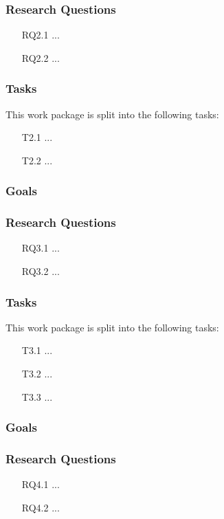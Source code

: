 \subsubsection{Research Questions}
\begin{itemize}
	\item[RQ2.1] ...
	\item[RQ2.2] ...
\end{itemize}

\subsubsection{Tasks}
This work package is split into the following tasks:
\begin{itemize}
	\item[T2.1] ...
	\item[T2.2] ...
\end{itemize}


\subsubsection{Goals}
\blindtext

\subsubsection{Research Questions}
\begin{itemize}
	\item[RQ3.1] ...
	\item[RQ3.2] ...
\end{itemize}

\subsubsection{Tasks}
This work package is split into the following tasks:
\begin{itemize}
	\item[T3.1] ...
	\item[T3.2] ...
	\item[T3.3] ...
\end{itemize}


\subsubsection{Goals}
\blindtext

\subsubsection{Research Questions}
\begin{itemize}
	\item[RQ4.1] ...
	\item[RQ4.2] ...
\end{itemize}


